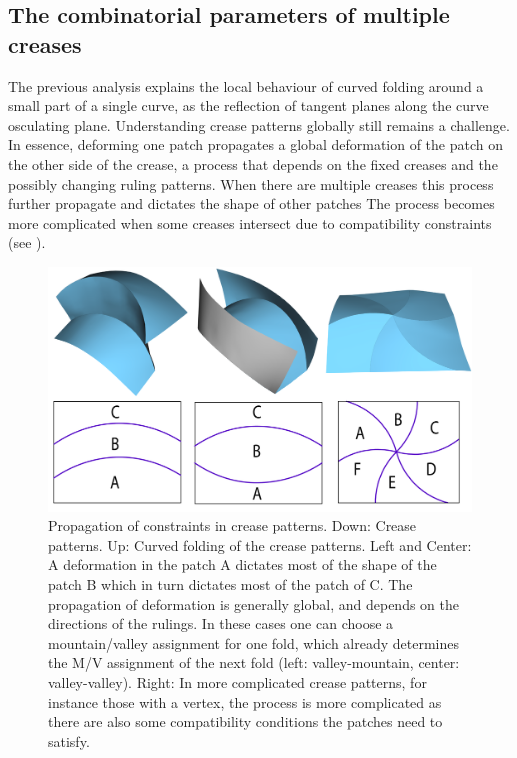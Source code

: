 

\subsection{The combinatorial parameters of multiple creases}
The previous analysis explains the local behaviour of curved folding around a small part of a single curve, as the reflection of tangent planes along the curve osculating plane. Understanding crease patterns globally still remains a challenge. In essence, deforming one patch propagates a global deformation of the patch on the other side of the crease, a process that depends on the fixed creases and the possibly changing ruling patterns. When there are multiple creases this process further propagate and dictates the shape of other patches The process becomes more complicated when some creases intersect due to compatibility constraints (see ). 

\begin{figure} [h]
	\centering
	\includegraphics[width=\linewidth]{figures/multiple_crease_patterns}
	\caption{Propagation of constraints in crease patterns. Down: Crease patterns. Up: Curved folding of the crease patterns. Left and Center: A deformation in the patch A dictates most of the shape of the patch B which in turn dictates most of the patch of C. The propagation of deformation is generally global, and depends on the directions of the rulings. In these cases one can choose a mountain/valley assignment for one fold, which already determines the M/V assignment of the next fold (left: valley-mountain, center: valley-valley). Right: In more complicated crease patterns, for instance those with a vertex, the process is more complicated as there are also some compatibility conditions the patches need to satisfy. }
	\label{fig:multiple_crease_patterns}
\end{figure}

